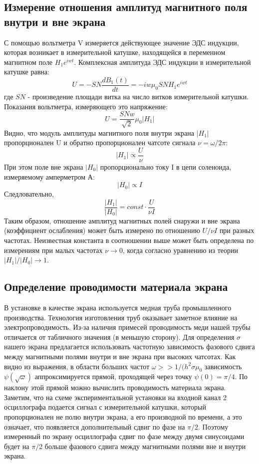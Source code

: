 \documentclass[a4paper]{article}
\begin{document}
\subsection{Измерение отношения амплитуд магнитного поля внутри и вне экрана}
С помощью вольтметра V измеряется действующее значение ЭДС индукции, которая возникает в измерительной катушке, находящейся в переменном магнитном поле $H_1e^{iwt}$. Комплексная амплитуда ЭДС индукции в измерительной катушке равна:
$$U = -SN\frac{dB_1(t)}{dt} = -iw\mu_{0}SNH_1e^{iwt}$$
где $SN$ - произведение площади витка на число витков измерительной катушки. Показания вольтметра, измеряющего это напряжение:
$$ U = \frac{SNw}{\sqrt{2}}\mu_{0}|H_1|$$
Видно, что модуль амплитуды магнитного поля внутри экрана $|H_1|$ пропорционален U и обратно пропорционален чатсоте сигнала $\nu = \omega/2\pi$:
$$|H_1| \propto \frac{U}{\nu}$$
При этом поле вне экрана $|H_0|$ пропорционально току I в цепи соленоида, измеряемому амперметром А:
$$|H_0| \propto I$$
Следловательно, 
$$\frac{|H_1|}{|H_0|} = const \cdot \frac{U}{\nu I}$$
Таким образом, отношение амплитуд магнитных полей снаружи и вне экрана (коэффициент ослабления) может быть измерено по отношению $U/\nu I$ при разных частотах. Неизвестная константа в соотношении выше может быть определена по измерениям при малых частотах $\nu \rightarrow 0$, когда согласно уравнению из теории $|H_1|/|H_0| \rightarrow 1$.\\
\subsection{Определение проводимости материала экрана}
В установке в качестве экрана используется медная труба промышленного производства. Технология изготовления труб оказывает заметное влияние на электропроводимость. Из-за наличия примесей проводимость меди нашей трубы отличается от табличного значения (в меньшую сторону). Для определения $\sigma$ нашего экрана предлагается использовать частотную зависимость фазового сдвига между магнитными полями внутри и вне экрана при высоких чатсотах. Как видно из выражения, в области больших частот $\omega >> 1/(h^2\sigma \mu_0$ зависимость $\psi(\sqrt{\omega})$ аппроксимируется прямой, проходящей через точку $\psi(0) = \pi/4$. По наклону этой прямой можно вычислить проводимость материала экрана. \\
Заметим, что на схеме экспериментальной установки на входной канал 2 осциллографа подается сигнал с измерительной катушки, который пропорционален не полю внутри экрана, а его производной по времени, а это означает, что появляется дополнительный сдвиг по фазе на $\pi/2$. Поэтому измеренный по экрану осциллографа сдвиг по фазе между двумя синусоидами будет на $\pi/2$ больше фазового сдвига между магнитными полями вне и внутри экрана.\\
\end{document}
